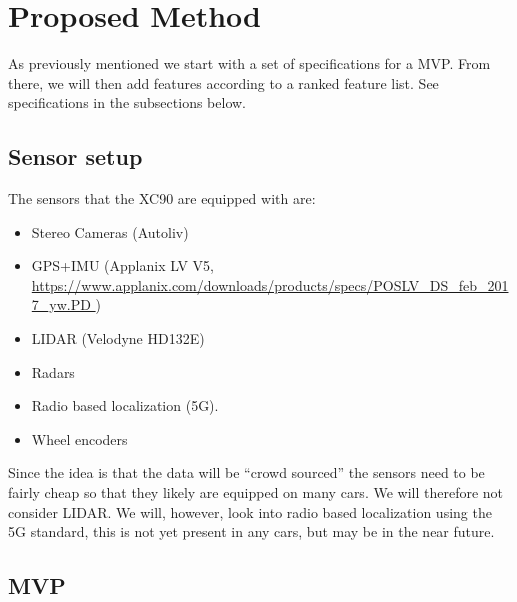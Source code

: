 \section{Proposed Method}

As previously mentioned we start with a set of specifications for a \gls{MVP}. From there, we will then add features according to a ranked feature list. See specifications in the subsections below.

\subsection{Sensor setup}\label{sec:sensor-setup}
The sensors that the XC90 are equipped with are:
\begin{itemize}
\item Stereo Cameras (Autoliv)
\item GPS+IMU (Applanix LV V5,
  \url{https://www.applanix.com/downloads/products/specs/POSLV_DS_feb_2017_yw.PD
  })
\item  \gls{LIDAR} (Velodyne HD132E)
\item  Radars
\item  Radio based localization (5G).
\item  Wheel encoders
\end{itemize}

Since the idea is that the data will be “crowd sourced” the sensors
need to be fairly cheap so that they likely are equipped on many
cars. We will therefore not consider \gls{LIDAR}. We will, however, look
into radio based localization using the 5G standard, this is not yet
present in any cars, but may be in the near future.

\subsection{\gls{MVP}}


